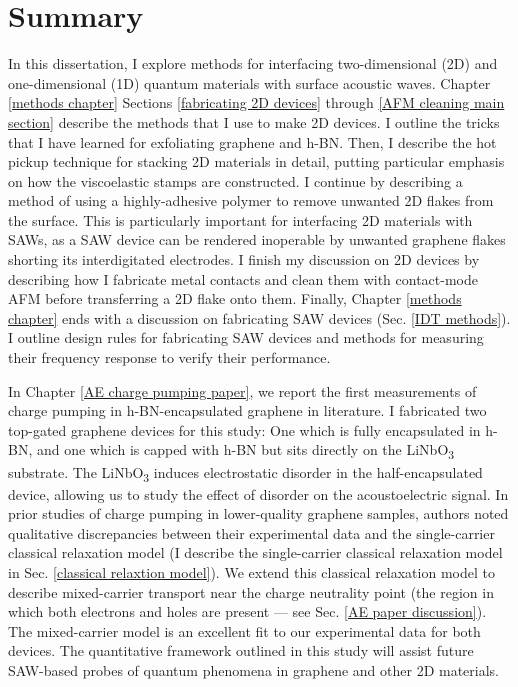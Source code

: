 \documentclass[double,12pt,1in,seploa]{beavtex}
\let\Oldsection\section
\renewcommand{\section}{\FloatBarrier\Oldsection}
\begin{document}
\section{Summary}
In this dissertation, I explore methods for interfacing two-dimensional (2D) and one-dimensional (1D) quantum materials with surface acoustic waves. Chapter \ref{methods chapter} Sections \ref{fabricating 2D devices} through \ref{AFM cleaning main section} describe the methods that I use to make 2D devices. I outline the tricks that I have learned for exfoliating graphene and h-BN. Then, I describe the hot pickup technique for stacking 2D materials in detail, putting particular emphasis on how the viscoelastic stamps are constructed. I continue by describing a method of using a highly-adhesive polymer to remove unwanted 2D flakes from the surface. This is particularly important for interfacing 2D materials with SAWs, as a SAW device can be rendered inoperable by unwanted graphene flakes shorting its interdigitated electrodes. I finish my discussion on 2D devices by describing how I fabricate metal contacts and clean them with contact-mode AFM before transferring a 2D flake onto them. Finally, Chapter \ref{methods chapter} ends with a discussion on fabricating SAW devices (Sec. \ref{IDT methods}). I outline design rules for fabricating SAW devices and methods for measuring their frequency response to verify their performance.

In Chapter \ref{AE charge pumping paper}, we report the first measurements of charge pumping in h-BN-encapsulated graphene in literature. I fabricated two top-gated graphene devices for this study: One which is fully encapsulated in h-BN, and one which is capped with h-BN but sits directly on the LiNbO\textsubscript{3} substrate. The LiNbO\textsubscript{3} induces electrostatic disorder in the half-encapsulated device, allowing us to study the effect of disorder on the acoustoelectric signal. In prior studies of charge pumping in lower-quality graphene samples, authors noted qualitative discrepancies between their experimental data and the single-carrier classical relaxation model (I describe the single-carrier classical relaxation model in Sec. \ref{classical relaxtion model}). We extend this classical relaxation model to describe mixed-carrier transport near the charge neutrality point (the region in which both electrons and holes are present — see Sec. \ref{AE paper discussion}). The mixed-carrier model is an excellent fit to our experimental data for both devices. The quantitative framework outlined in this study will assist future SAW-based probes of quantum phenomena in graphene and other 2D materials.
\end{document}
